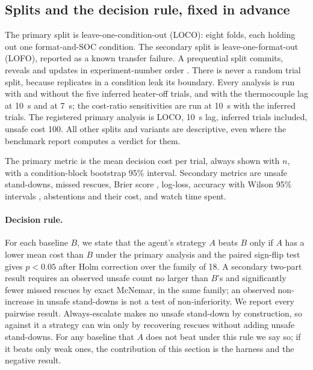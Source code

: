 \documentclass[11pt]{article}
\begin{document}
\subsection{Splits and the decision rule, fixed in advance}
The primary split is leave-one-condition-out (LOCO): eight folds, each holding out one format-and-SOC condition. The
secondary split is leave-one-format-out (LOFO), reported as a known transfer failure. A prequential split commits,
reveals and updates in experiment-number order \citep{dawid1984}. There is never a random trial split, because
replicates in a condition leak its boundary. Every analysis is run with and without the five inferred heater-off
trials, and with the thermocouple lag at 10~s and at 7~s; the cost-ratio sensitivities are run at 10~s with the
inferred trials. The registered primary analysis is LOCO, 10~s lag, inferred trials included, unsafe cost 100. All
other splits and variants are descriptive, even where the benchmark report computes a verdict for them.

The primary metric is the mean decision cost per trial, always shown with $n$, with a condition-block bootstrap 95\%
interval. Secondary metrics are unsafe stand-downs, missed rescues, Brier score \citep{brier1950}, log-loss, accuracy
with Wilson 95\% intervals \citep{wilson1927}, abstentions and their cost, and watch time spent.

\paragraph{Decision rule.} For each baseline $B$, we state that the agent's strategy $A$ beats $B$ only if $A$ has a
lower mean cost than $B$ under the primary analysis and the paired sign-flip test gives $p < 0.05$ after Holm
correction over the family of 18. A secondary two-part result requires an observed unsafe count no larger than $B$'s
and significantly fewer missed rescues by exact McNemar, in the same family; an observed non-increase in unsafe
stand-downs is not a test of non-inferiority. We report every pairwise result. Always-escalate makes no unsafe
stand-down by construction, so against it a strategy can win only by recovering rescues without adding unsafe
stand-downs. For any baseline that $A$ does not beat under this rule we say so; if it beats only weak ones, the
contribution of this section is the harness and the negative result.
\end{document}
